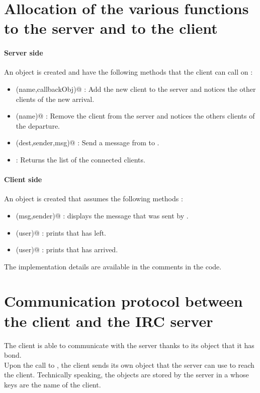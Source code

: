 \documentclass{article}
\begin{document}
\section{Allocation of the various functions to the server and to the client}
\paragraph{Server side}
An object \verb@myIRCObject@ is created and have the following methods that the client can call on : 
\begin{itemize}
\item \verb@connect(name,callbackObj)@ : Add the new client to the server and notices the other clients of the new arrival.
\item \verb@disconnect(name)@ : Remove the client from the server and notices the others clients of the departure.
\item \verb@sendMsg(dest,sender,msg)@ : Send a message \verb@msg@ from \verb@sender@ to \verb@dest@.
\item \verb@who@ : Returns the list of the connected clients.
\end{itemize}

\paragraph{Client side}
An object \verb@myIRCCallbackImpl@ is created that assumes the following methods :
\begin{itemize}
\item \verb@receiveMsg(msg,sender)@ : displays the message \verb@msg@ that was sent by \verb@sender@.
\item \verb@left(user)@ : prints that \verb@user@ has left.
\item \verb@arrived(user)@ : prints that \verb@user@ has arrived.
\end{itemize}

The implementation details are available in the comments in the code.

\section{Communication protocol between the client and the IRC server}

The client is able to communicate with the server thanks to its object that it has bond.\\
Upon the call to \verb@connect@, the client sends its own \verb@myIRCCallbackImpl@ object that the server can use to reach the client. Technically speaking, the \verb@myIRCCallbackImpl@ objects are stored by the server in a \verb@hashmap@ whose keys are the name of the client.
\end{document}
